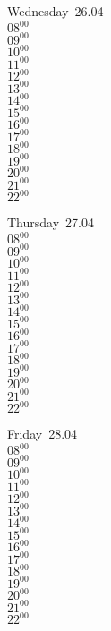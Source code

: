 \documentclass[11pt,a4paper]{book}\usepackage[]{graphicx}\usepackage[]{color}
\begin{document}
\begin{weekdaybox}
  Wednesday~26.04\\
  { 
  \vfill
  $08^{00}$\\
$09^{00}$\\
$10^{00}$\\
$11^{00}$\\
$12^{00}$\\
$13^{00}$\\
$14^{00}$\\
$15^{00}$\\
$16^{00}$\\
$17^{00}$\\
$18^{00}$\\
$19^{00}$\\
$20^{00}$\\
$21^{00}$\\
$22^{00}$\\
  }
\end{weekdaybox}
\clearpage
\begin{headerbox}
\end{headerbox}
\begin{weekdaybox}
  Thursday~27.04\\
  { 
  \vfill
  $08^{00}$\\
$09^{00}$\\
$10^{00}$\\
$11^{00}$\\
$12^{00}$\\
$13^{00}$\\
$14^{00}$\\
$15^{00}$\\
$16^{00}$\\
$17^{00}$\\
$18^{00}$\\
$19^{00}$\\
$20^{00}$\\
$21^{00}$\\
$22^{00}$\\
  }
\end{weekdaybox} 
\begin{weekdaybox}
  Friday~28.04\\
  { 
  \vfill
  $08^{00}$\\
$09^{00}$\\
$10^{00}$\\
$11^{00}$\\
$12^{00}$\\
$13^{00}$\\
$14^{00}$\\
$15^{00}$\\
$16^{00}$\\
$17^{00}$\\
$18^{00}$\\
$19^{00}$\\
$20^{00}$\\
$21^{00}$\\
$22^{00}$\\
  }
\end{weekdaybox}
\end{document}
